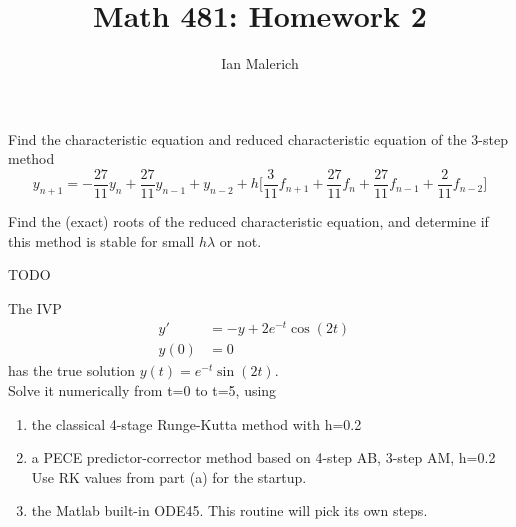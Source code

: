 \documentclass{jhwhw}
\author{Ian Malerich}
\title{Math 481: Homework 2}
\begin{document}
\problem{}

    Find the characteristic equation and reduced characteristic equation of the 3-step method
    $$
	y_{n+1} = -\frac{27}{11}y_n + \frac{27}{11}y_{n-1} + y_{n-2} + 
	h\biggr[\frac{3}{11}f_{n+1} + \frac{27}{11}f_n + \frac{27}{11}f_{n-1} + \frac{2}{11}f_{n-2}\biggr]
    $$

    Find the (exact) roots of the reduced characteristic equation, and determine if this method
    is stable for small $h\lambda$ or not.

\solution
    
    TODO

\problem{}

    The IVP
    \begin{align*}
	y' &= -y + 2e^{-t}\cos(2t) &\\
	y(0) &= 0
    \end{align*}
    has the true solution $y(t) = e^{-t}\sin(2t)$. \\
    Solve it numerically from t=0 to t=5, using
    \begin{enumerate}
	\item the classical 4-stage Runge-Kutta method with h=0.2
	\item a PECE predictor-corrector method based on 4-step AB, 3-step AM, h=0.2 \\
	    Use RK values from part (a) for the startup.
	\item the Matlab built-in ODE45. This routine will pick its own steps.
    \end{enumerate}
\end{document}
